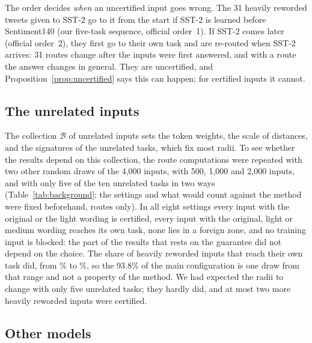 The order decides \emph{when} an uncertified input goes wrong. The 31 heavily
reworded tweets given to SST-2 go to it from the start if SST-2 is learned before
Sentiment140 (our five-task sequence, official order~1). If SST-2 comes later (official
order~2), they first go to their own task and are re-routed when SST-2
arrives: 31 routes change after the inputs were first answered, and with a route the answer
changes in general. They are uncertified, and
Proposition~\ref{prop:uncertified} says this can happen; for certified inputs it cannot.

\subsection{The unrelated inputs}
\label{sec:background}

The collection $\mathcal{B}$ of unrelated inputs sets the token
weights, the scale of distances, and the signatures of the unrelated tasks, which fix most radii. To see whether the results depend on this collection, the route
computations were repeated with two other random draws of the 4{,}000 inputs, with 500, 1{,}000 and 2{,}000 inputs,
and with only five of the ten unrelated tasks in two ways (Table~\ref{tab:background}; the settings and what would count against the method were fixed beforehand, routes only). In
all eight settings every input with the original or the light wording is certified, every input
with the original, light or medium wording reaches its own task, none lies in a foreign zone,
and no training input is blocked: the part of the results that rests on the guarantee did not depend on the choice. The share of heavily reworded inputs that reach their own task did,
from \BackgroundHeavyLow{}\% to \BackgroundHeavyHigh{}\%, so the 93.8\% of the main configuration is one draw from that range and not a property of the method.
We had expected the radii to change with only five unrelated tasks; they hardly did, and at most two more heavily reworded inputs were certified.

\subsection{Other models}
\label{sec:models}

